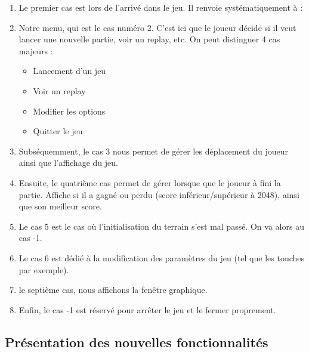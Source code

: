 \documentclass[letter]{article}
\begin{document}
\begin{enumerate}
\item Le premier cas est lors de l'arrivé dans le jeu. Il renvoie systématiquement à :
\item Notre menu, qui est le cas numéro 2. C'est ici que le joueur décide si il veut lancer une nouvelle partie, voir un replay, etc. On peut distinguer 4 cas majeurs :
\begin{itemize}
\item Lancement d'un jeu
\item Voir un replay
\item Modifier les options
\item Quitter le jeu
\end{itemize}
\item Subséquemment, le cas 3 nous permet de gérer les déplacement du joueur ainsi que l’affichage du jeu.
\item Ensuite, le quatrième cas permet de gérer lorsque que le joueur à fini la partie. Affiche si il a gagné ou perdu (score inférieur/supérieur à 2048), ainsi que son meilleur score.
\item Le cas 5 est le cas où l'initialisation du terrain s'est mal passé. On va alors au cas -1.
\item Le cas 6 est dédié à la modification des paramètres du jeu (tel que les touches par exemple).
\item le septième cas, nous affichons la fenêtre graphique.
\item Enfin, le cas -1 est réservé pour arrêter le jeu et le fermer proprement.
\end{enumerate}



\subsection{Présentation des nouvelles fonctionnalités}
\label{sec:org8d37d64}
\end{document}
